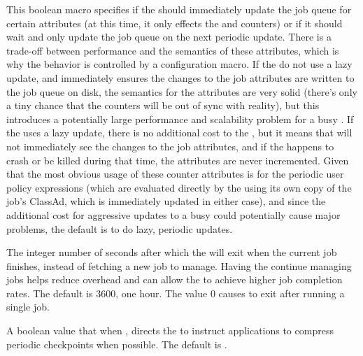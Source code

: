 \begin{description}
\label{param:ShadowLazyQueueUpdate}
\item[\Macro{SHADOW\_LAZY\_QUEUE\_UPDATE}]
  This boolean macro specifies if the  should
  immediately update the job queue for certain attributes (at this
  time, it only effects the  and
   counters) or if it should wait and only
  update the job queue on the next periodic update.
  There is a trade-off between performance and the semantics of these
  attributes, which is why the behavior is controlled by a
  configuration macro.
  If the  do not use a lazy update, and immediately
  ensures the changes to the job attributes are written to the job
  queue on disk, the semantics for the attributes are very solid
  (there's only a tiny chance that the counters will be out of sync
  with reality), but this introduces a potentially large performance
  and scalability problem for a busy .
  If the  uses a lazy update, there is no additional cost
  to the , but it means that  will not
  immediately see the changes to the job attributes, and if the
   happens to crash or be killed during that time, the
  attributes are never incremented.
  Given that the most obvious usage of these counter attributes is for
  the periodic user policy expressions (which are evaluated directly
  by the  using its own copy of the job's ClassAd,
  which is immediately updated in either case), and since the
  additional cost for aggressive updates to a busy 
  could potentially cause major problems, the default is 
  to do lazy, periodic updates.

\label{param:ShadowWorklife}
\item[\Macro{SHADOW\_WORKLIFE}]
  The integer number of seconds after which the  will exit
  when the current job finishes, instead of fetching a new job to
  manage.  Having the  continue managing jobs helps
  reduce overhead and can allow the  to achieve higher
  job completion rates.  The default is 3600, one hour.  The value 0
  causes  to exit after running a single job.

\label{param:CompressPeriodicCkpt}
\item[\Macro{COMPRESS\_PERIODIC\_CKPT}]
  A boolean value that when , directs the 
  to instruct applications to compress periodic checkpoints when possible.
  The default is .


\end{description}
